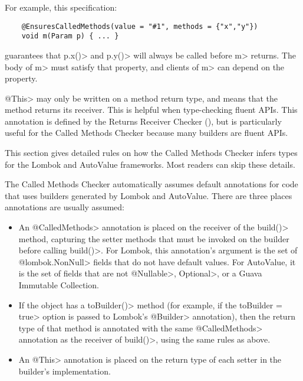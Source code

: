 \begin{description}
  For example, this specification:

  \begin{Verbatim}
    @EnsuresCalledMethods(value = "#1", methods = {"x","y"})
    void m(Param p) { ... }
  \end{Verbatim}

  guarantees that \<p.x()> and \<p.y()> will always be called before \<m> returns.
  The body of \<m> must satisfy that property, and clients of \<m> can depend on the property.

\item[\refqualclass{common/returnsreceiver/qual}{This}]
  \<@This> may only be written on a method return type, and means that the method returns its receiver.
  This is helpful when type-checking fluent APIs. This annotation is defined by the
  Returns Receiver Checker (), but is particularly useful
  for the Called Methods Checker because many builders are fluent APIs.

\end{description}


This section gives detailed rules on how the Called Methods Checker infers types for the Lombok
and AutoValue frameworks. Most readers can skip these details.

The Called Methods Checker automatically assumes default annotations for code that uses builders generated
by Lombok and AutoValue. There are three places annotations are usually assumed:
\begin{itemize}
\item An \<@CalledMethods> annotation is placed on the receiver of the \<build()> method, capturing the
setter methods that must be invoked on the builder before calling \<build()>. For Lombok,
this annotation's argument is the set of \<@lombok.NonNull> fields that do not have default values.
For AutoValue, it is the set of fields that are not \<@Nullable>, \<Optional>, or a Guava Immutable
Collection.
\item If the object has a \<toBuilder()> method (for example, if the \<toBuilder = true> option is
passed to Lombok's \<@Builder> annotation), then the return type of that method is annotated with
the same \<@CalledMethods> annotation as the receiver of \<build()>, using the same rules as above.
\item An \<@This> annotation is placed on the return type of each setter in the builder's implementation.
\end{itemize}

